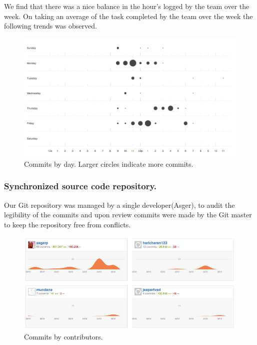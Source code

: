 We find that there was a nice balance in the hour's logged by the team over the week. On taking an average of the task completed by the team over the week the following trends was observed.
\begin{figure}[!ht]
  \centering
    \includegraphics[width=1.0\textwidth]{images/commits.png}
  \caption{Commits by day. Larger circles indicate more commits.}
\end{figure}

\subsubsection{Synchronized source code repository.} %
\label{ssub:Synchronized source code repository.}

Our Git repository was managed by a single developer(Asger), to audit the legibility of the commits and upon review commits were made by the Git master to keep the repository free from conflicts.
\begin{figure}[!ht]
  \centering
    \includegraphics[width=1.0\textwidth]{images/contrib.png}
  \caption{Commits by contributors.}
\end{figure}

